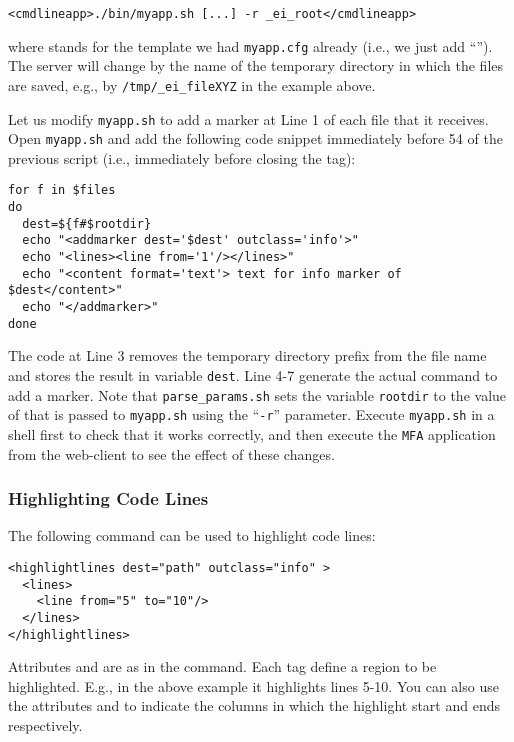 \medskip
\begin{lstlisting}
<cmdlineapp>./bin/myapp.sh [...] -r _ei_root</cmdlineapp>
\end{lstlisting}

\medskip
\noindent
where \lst{[...]} stands for the template we had \texttt{myapp.cfg}
already (i.e., we just add ``'').
%
The server will change  by the name of the temporary
directory in which the files are saved, e.g., by
\texttt{/tmp/\_ei\_fileXYZ} in the example above.

Let us modify \texttt{myapp.sh} to add a marker at Line 1 of each file
that it receives. Open \texttt{myapp.sh} and add the following code
snippet immediately before 54 of the previous script (i.e.,
immediately before closing the  tag):

\medskip
\begin{lstlisting}[style=script]
for f in $files 
do
  dest=${f#$rootdir}
  echo "<addmarker dest='$dest' outclass='info'>"
  echo "<lines><line from='1'/></lines>"
  echo "<content format='text'> text for info marker of $dest</content>"
  echo "</addmarker>"
done
\end{lstlisting}

\medskip
\noindent
The code at Line 3 removes the temporary directory prefix from the file
name and stores the result in variable \texttt{dest}. Line 4-7
generate the actual command to add a marker.
%
Note that \texttt{parse\_params.sh} sets the variable \texttt{rootdir}
to the value of  that is passed to \texttt{myapp.sh}
using the ``\texttt{-r}'' parameter.
%
Execute \texttt{myapp.sh} in a shell first to check that it works
correctly, and then execute the \texttt{MFA} application from the
web-client to see the effect of these changes.

\subsubsection{Highlighting Code Lines}

The following command can be used to highlight code lines:

\medskip
\begin{lstlisting}
<highlightlines dest="path" outclass="info" > 
  <lines>
    <line from="5" to="10"/>
  </lines>
</highlightlines>
\end{lstlisting}

\medskip
\noindent
Attributes  and  are as in the 
command. Each  tag define a region to be highlighted. E.g.,
in the above example it highlights lines 5-10. You can also use the
attributes  and  to indicate the columns in
which the highlight start and ends respectively.

